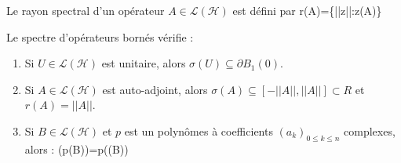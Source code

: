\begin{Def}
Le rayon spectral d'un opérateur $A\in\mathcal L(\mathcal H)$ est défini par 
\beq
r(A)=\sup\{||z||:z\in\sigma(A)\}
\eeq
\end{Def}

\begin{The} Le spectre d'opérateurs bornés vérifie :
\begin{enumerate}
\item Si $U\in\mathcal L(\mathcal H)$ est unitaire, alors $\sigma(U)\subseteq \partial B_1(0)$.
\item Si $A\in\mathcal L(\mathcal H)$ est auto-adjoint, alors $\sigma(A)\subseteq [-||A||,||A||]\subset R$ et $r(A)=||A||$.
\item Si $B\in\mathcal L(\mathcal H)$ et $p$ est un polynômes à coefficients $(a_k)_{0\leq k\leq n}$ complexes, alors :
\beq
\sigma(p(B))=p(\sigma(B))
\eeq
\end{enumerate}
\end{The}

